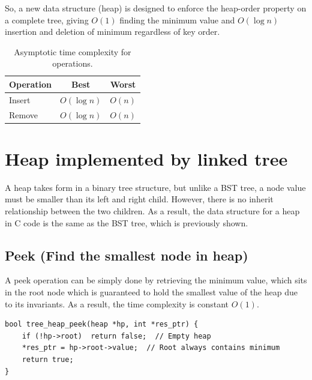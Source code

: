 \documentclass[a4paper,11pt]{article}
\begin{document}
So, a new data structure (heap) is designed to enforce the heap-order property on a complete tree, giving $O(1)$ finding the minimum value and $O(\log n)$ insertion and deletion of minimum regardless of key order.


\begin{table}[h]
\centering
\begin{tabular}{lcc}
\hline
\textbf{Operation} & \textbf{Best} & \textbf{Worst} \\
\hline
Insert & $O(\log n)$ & \textbf{$O(n)$} \\
Remove & $O(\log n)$ & \textbf{$O(n)$} \\
\hline
\end{tabular}
\caption{Asymptotic time complexity for operations.}
\label{tab:op-complexity}
\end{table}

\section*{Heap implemented by linked tree}

A heap takes form in a binary tree structure, but unlike a BST tree, a node value must be smaller than its left and right child. However, there is no inherit relationship between the two children. As a result, the data structure for a heap in C code is the same as the BST tree, which is previously shown.

\subsection*{Peek (Find the smallest node in heap)}

A peek operation can be simply done by retrieving the minimum value, which sits in the root node which is guaranteed to hold the smallest value of the heap due to its invariants. As a result, the time complexity is constant $O(1)$.

\begin{verbatim}
bool tree_heap_peek(heap *hp, int *res_ptr) {
    if (!hp->root)  return false;  // Empty heap
    *res_ptr = hp->root->value;  // Root always contains minimum
    return true;
}
\end{verbatim}
\end{document}

